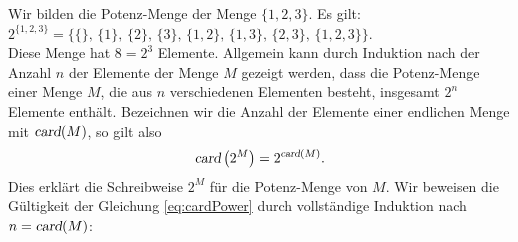 \example
Wir bilden  die Potenz-Menge der Menge $\{1,2,3\}$.  Es gilt: \\[0.2cm]
\hspace*{1.3cm} $2^{\{1,2,3\}} = \big\{ \{\},\, \{1\}, \, \{2\},\, \{3\},\, \{1,2\}, \, \{1,3\}, \, \{2,3\},\, \{1,2,3\}\big\}$. \\[0.2cm]
Diese Menge hat $8 = 2^3$ Elemente.  Allgemein kann durch Induktion nach der Anzahl $n$ der
Elemente der Menge $M$ gezeigt werden, dass die 
Potenz-Menge einer Menge $M$, die aus $n$ verschiedenen Elementen besteht, insgesamt $2^n$ 
Elemente enth\"{a}lt.  Bezeichnen wir die Anzahl der Elemente einer endlichen Menge mit
$\textsl{card}(M)$, so gilt also
\begin{equation}
  \label{eq:cardPower}
\textsl{card}\left(2^M\right) = 2^{\textsl{card}(M)}.  
\end{equation}
Dies erkl\"{a}rt die Schreibweise $2^M$ f\"{u}r die Potenz-Menge von $M$.  Wir beweisen die
G\"{u}ltigkeit der Gleichung \ref{eq:cardPower} durch vollst\"{a}ndige Induktion nach $n =
\textsl{card}(M)$:

